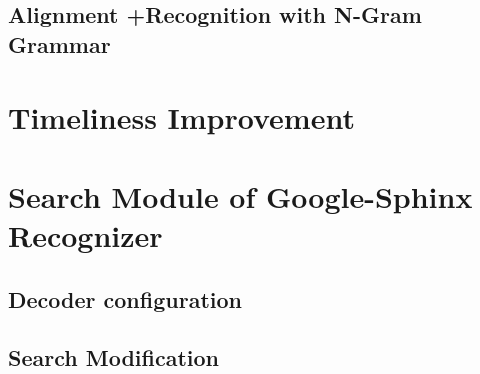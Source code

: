 \subsection {Alignment +Recognition with N-Gram Grammar}



\section {Timeliness Improvement}




\section {Search Module of Google-Sphinx Recognizer}
\subsection {Decoder configuration}
\subsection {Search Modification}